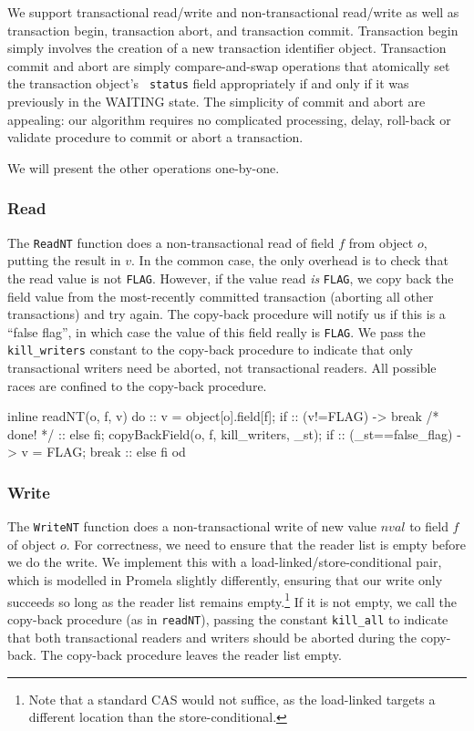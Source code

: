 \documentclass{csa-sig-alternate}
\newenvironment{inlinecode}%
  {\par\linespread{0.9}\footnotesize\samepage%
\verbatim}%
  {\endverbatim}
\newcommand{\FLAG}{\texttt{FLAG}\xspace}
\begin{document}
We support transactional read/write and non-transactional read/write
as well as transaction begin, transaction abort, and transaction
commit.  Transaction begin simply involves the creation of a new
transaction identifier object.  Transaction commit and abort are simply
compare-and-swap operations that atomically set the transaction object's {\tt
  status} field appropriately if and only if it was previously in the
WAITING state.
The simplicity of commit and abort are appealing: our algorithm
requires no complicated processing, delay, roll-back or validate
procedure to commit or abort a transaction.

We will present the other operations one-by-one.

\subsubsection{Read}\label{sec:readnt}

The {\tt ReadNT} function does a non-transactional read of field $f$ from
object $o$, putting the result in $v$.
In the common case, the only overhead is to check that
the read value is not \FLAG.  However, if the value read \emph{is}
\FLAG, we copy back the field value 
from the most-recently committed transaction (aborting all other
transactions) and try again.  The copy-back procedure will notify
us if this is a ``false flag'', in which case the value of this
field really is \FLAG.  We pass the {\tt kill\_writers} constant
to the copy-back procedure to
indicate that only transactional writers need be aborted, not
transactional readers.
All possible races are confined to the copy-back procedure.
\begin{inlinecode}
inline readNT(o, f, v) {
  do
  :: v = object[o].field[f];
     if
     :: (v!=FLAG) -> break /* done! */
     :: else
     fi;
     copyBackField(o, f, kill_writers, _st);
     if
     :: (_st==false_flag) ->
        v = FLAG;
        break
     :: else
     fi
  od
}
\end{inlinecode}

\subsubsection{Write}
The {\tt WriteNT} function does a non-transactional write of new value $nval$
to field $f$ of object $o$.  For correctness, we need to ensure that
the reader list is empty before we do the write.  We implement this
with a load-linked/store-conditional pair, which is modelled in
Promela slightly differently, ensuring that our write only succeeds
so long as the reader list remains empty.\footnote{Note that a
  standard CAS would not suffice, as the load-linked targets a
  different location than the store-conditional.}
If it is not empty, we
call the copy-back procedure (as in {\tt readNT}), passing the
constant {\tt kill\_all} to indicate that both transactional readers
and writers should be aborted during the copy-back.  The copy-back
procedure leaves the reader list empty.
\end{document}
